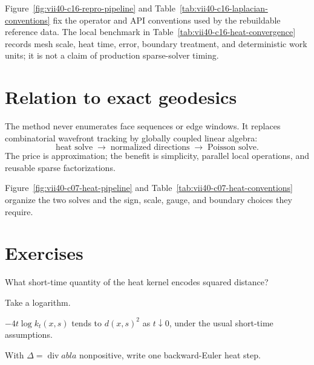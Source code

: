 Figure~\ref{fig:vii40-c16-repro-pipeline} and
Table~\ref{tab:vii40-c16-laplacian-conventions} fix the operator and API
conventions used by the rebuildable reference data.  The local benchmark in
Table~\ref{tab:vii40-c16-heat-convergence} records mesh scale, heat time,
error, boundary treatment, and deterministic work units; it is not a claim of
production sparse-solver timing.



\section{Relation to exact geodesics}

The method never enumerates face sequences or edge windows.  It replaces
combinatorial wavefront tracking by globally coupled linear algebra:
\[
\text{heat solve}
\;\longrightarrow\;
\text{normalized directions}
\;\longrightarrow\;
\text{Poisson solve}.
\]
The price is approximation; the benefit is simplicity, parallel local
operations, and reusable sparse factorizations.


Figure~\ref{fig:vii40-c07-heat-pipeline} and Table~\ref{tab:vii40-c07-heat-conventions}
organize the two solves and the sign, scale, gauge, and boundary choices they require.


\section{Exercises}

\begin{exercise}\label{exr:vii40-01}
What short-time quantity of the heat kernel encodes squared distance?
\end{exercise}

\begin{hint}
Take a logarithm.
\end{hint}

\begin{solution}
\(-4t\log k_t(x,s)\) tends to \(d(x,s)^2\) as \(t\downarrow0\), under the usual short-time assumptions.
\end{solution}

\begin{exercise}\label{exr:vii40-02}
With \(\Delta=\operatorname{div}
abla\) nonpositive, write one backward-Euler heat step.
\end{exercise}

